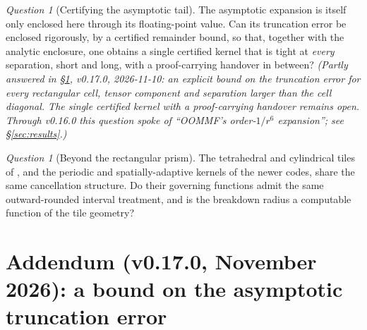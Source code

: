 \documentclass[11pt]{amsart}
\theoremstyle{plain}
\theoremstyle{definition}
\theoremstyle{remark}
\newtheorem{question}[theorem]{Question}
\begin{document}
\begin{question}[Certifying the asymptotic tail]
The asymptotic expansion is itself only enclosed here through its floating-point
value. Can its truncation error be enclosed rigorously, by a certified remainder
bound, so that, together with the analytic enclosure, one obtains a single
certified kernel that is tight at \emph{every} separation, short and long, with a
proof-carrying handover in between? \emph{(Partly answered in
\S\ref{sec:bound}, v0.17.0, 2026-11-10: an explicit bound on the truncation error for every
rectangular cell, tensor component and separation larger than the cell diagonal. The
single certified kernel with a proof-carrying handover remains open. Through
v0.16.0 this question spoke of ``OOMMF's order-$1/r^{6}$ expansion''; see
\S\ref{sec:results}.)}
\end{question}

\begin{question}[Beyond the rectangular prism]
The tetrahedral and cylindrical tiles of \cite{Bjork2023}, and the periodic and
spatially-adaptive kernels of the newer codes, share the same cancellation
structure. Do their governing functions admit the same outward-rounded interval
treatment, and is the breakdown radius a computable function of the tile geometry?
\end{question}

\section{Addendum (v0.17.0, November 2026): a bound on the asymptotic truncation error}\label{sec:bound}
\end{document}
